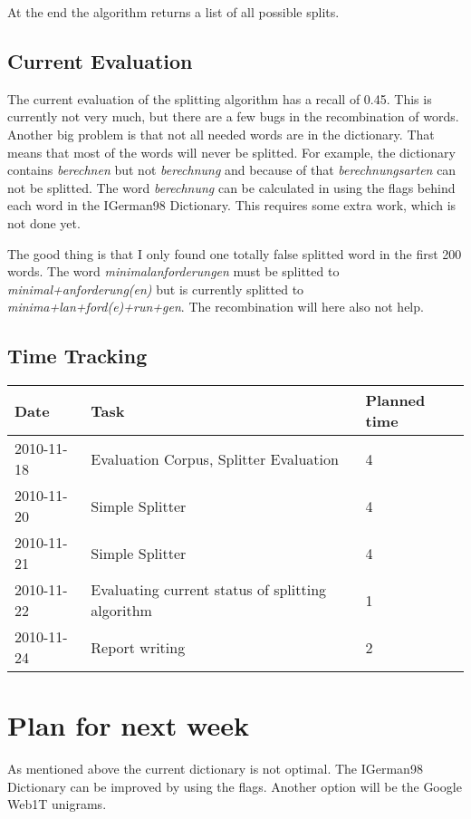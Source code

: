 \documentclass[11pt, accentcolor=tud9b, nochapname]{tudexercise}
\begin{document}
At the end the algorithm returns a list of all possible splits.

\subsection{Current Evaluation}
The current evaluation of the splitting algorithm has a recall of 0.45. This is currently not very much, but there are a few bugs in the recombination of words. Another big problem is that not all needed words are in the dictionary. That means that most of the words will never be splitted. For example, the dictionary contains \emph{berechnen} but not \emph{berechnung} and because of that \emph{berechnungsarten} can not be splitted. The word \emph{berechnung} can be calculated in using the flags behind each word in the IGerman98 Dictionary. This requires some extra work, which is not done yet.

The good thing is that I only found one totally false splitted word in the first 200 words. The word \emph{minimalanforderungen} must be splitted to \emph{minimal+anforderung(en)} but is currently splitted to \emph{minima+lan+ford(e)+run+gen}. The recombination will here also not help.

\subsection{Time Tracking}

\begin{tabular}{l | l | l}
  \hline
  \textbf{Date} & \textbf{Task} & \textbf{Planned time} \\ \hline
  2010-11-18 & Evaluation Corpus, Splitter Evaluation & 4 \\ \hline
  2010-11-20 & Simple Splitter & 4 \\ \hline
  2010-11-21 & Simple Splitter & 4 \\ \hline
  2010-11-22 & Evaluating current status of splitting algorithm & 1 \\ \hline
  2010-11-24 & Report writing & 2 \\ \hline
\end{tabular}

\section{Plan for next week}
As mentioned above the current dictionary is not optimal. The IGerman98 Dictionary can be improved by using the flags. Another option will be the Google Web1T unigrams.
\end{document}

